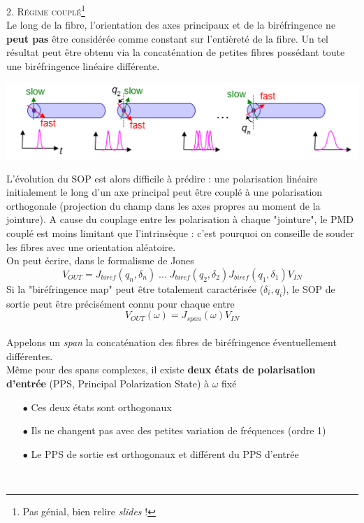 \textsc{2. Régime couplé}\footnote{Pas génial, bien relire \textit{slides} !}\\
Le long de la fibre, l'orientation des axes principaux et de la biréfringence ne \textbf{peut pas} 
être considérée comme constant sur l'entièreté de la fibre. Un tel résultat peut être obtenu via
la concaténation de petites fibres possédant toute une biréfringence linéaire différente.
\begin{center}
	\includegraphics[scale=0.75]{ch1/image51}
\end{center}
L'évolution du SOP est alors difficile à prédire : une polarisation linéaire initialement le long
d'un axe principal peut être couplé à une polarisation orthogonale (projection du champ dans les
axes propres au moment de la jointure). A cause du couplage entre les polarisation à chaque
"jointure", le PMD couplé est moins limitant que l'intrinsèque : c'est pourquoi on conseille de souder
 les fibres avec une orientation aléatoire. \\

 
 On peut écrire, dans le formalisme de Jones
 \begin{equation}
 {V_{OUT}} = {J_{biref}}({q_n},{\delta _n})\;...\;{J_{biref}}({q_2},{\delta _2}){J_{biref}}({q_1},
 {\delta _1}){V_{IN}}
 \end{equation}
 Si la "biréfringence map" peut être totalement caractérisée ($\delta_i, q_i$), le SOP de sortie peut
 être précisément connu pour chaque entre
 \begin{equation}
 {V_{OUT}}(\omega ) = {J_{span}}(\omega ){V_{IN}}
 \end{equation}\ \\
 \newpage
 	Appelons un \textit{span}  la concaténation des fibres de biréfringence éventuellement 
	différentes.\\

	 Même pour des spans complexes, il existe \textbf{deux états de polarisation d'entrée}
	(PPS, Principal Polarization State) à $\omega$ fixé
	\begin{itemize} 
	\item[$\bullet$] Ces deux états sont orthogonaux
	\item[$\bullet$] Ils ne changent pas avec des petites variation de fréquences (ordre 1)
	\item[$\bullet$] Le PPS de sortie est orthogonaux et différent du PPS d'entrée
	\end{itemize}\ 
	

